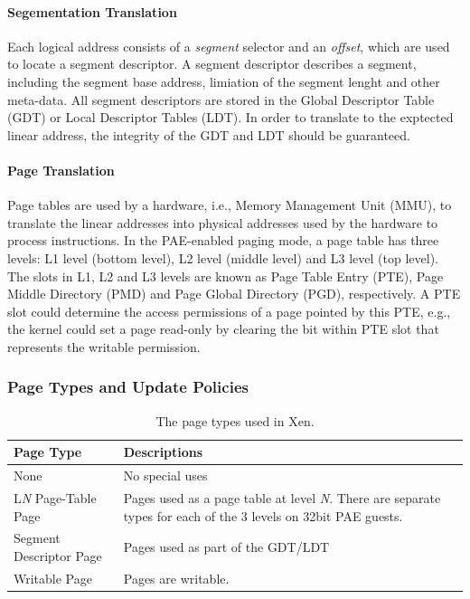 \paragraph{Segementation Translation}\label{sec:seg-trans}
Each logical address consists of a \emph{segment} selector and an \emph{offset}, which are used to locate a segment descriptor.
A segment descriptor describes a segment, including the segment base address, limiation of the segment lenght and other meta-data.
All segment descriptors are stored in the Global Descriptor Table (GDT) or Local Descriptor Tables (LDT). 
In order to translate to the exptected linear address, the integrity of the GDT and LDT should be guaranteed. 

\paragraph{Page Translation}\label{sec:page-trans}
Page tables are used by a hardware, i.e., Memory Management Unit (MMU), to translate the linear addresses into physical addresses used by the hardware to process instructions.
In the PAE-enabled paging mode, a page table has three levels: L1 level (bottom level), L2 level (middle level) and L3 level (top level).
The slots in L1, L2 and L3 levels are known as Page Table Entry (PTE), Page Middle Directory (PMD) and Page Global Directory (PGD), respectively.
A PTE slot could determine the access permissions of a page pointed by this PTE, e.g., the kernel could set a page read-only by clearing the bit within PTE slot that represents the writable permission.


\subsubsection{Page Types and Update Policies}\label{sec:pv-security}
\begin{table}[!ht]
\begin{center}
\begin{tabular}{|p{1.7cm}|p{4.3cm}|}
\hline
{\textbf{Page Type}}  & {\textbf{Descriptions}}     \\ \hline
None & No special uses \\ \hline
L\emph{N} Page-Table Page & Pages used as a page table at level \emph{N}. There are separate types for each of the 3 levels on 32bit PAE guests. \\ \hline
Segment Descriptor Page & Pages used as part of the GDT/LDT \\ \hline
Writable Page & Pages are writable. \\ \hline
\end{tabular}
\end{center}
\caption{The page types used in Xen.}
\label{tab:pagetype}
\end{table}

